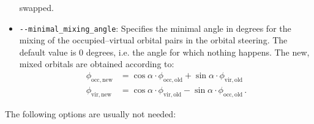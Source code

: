 \documentclass[]{tufte-book}
\begin{document}
\begin{itemize}
  swapped.
\item \texttt{-{}-minimal\_mixing\_angle}: Specifies the minimal angle in
  degrees for the 
  mixing of the occupied--virtual orbital pairs in the orbital steering. The
  default value is 0 degrees, i.e. the angle for which nothing happens.
  The new, mixed orbitals are obtained according to:
  \begin{align*}
    \phi_{\mathrm {occ, new}} &= \cos \alpha \cdot \phi_{\mathrm{occ, old}} + \sin \alpha \cdot
    \phi_{\mathrm {vir, old}}\\
    \phi_{\mathrm {vir, new}} &= \cos \alpha \cdot \phi_{\mathrm{vir, old}} - \sin \alpha \cdot
    \phi_{\mathrm {occ, old}} \, .
  \end{align*}

\end{itemize}

The following options are usually not needed:
\end{document}
